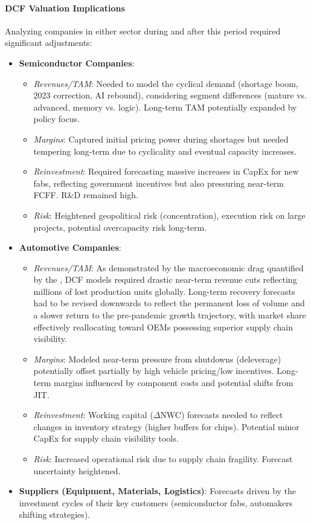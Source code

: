 \paragraph{DCF Valuation Implications}
Analyzing companies in either sector during and after this period required significant adjustments:
\begin{itemize}
    \item \textbf{Semiconductor Companies}:
          \begin{itemize}
              \item \textit{Revenues/TAM}: Needed to model the cyclical demand (shortage boom, 2023 correction, AI rebound), considering segment differences (mature vs. advanced, memory vs. logic). Long-term TAM potentially expanded by policy focus.
              \item \textit{Margins}: Captured initial pricing power during shortages but needed tempering long-term due to cyclicality and eventual capacity increases.
              \item \textit{Reinvestment}: Required forecasting massive increases in CapEx for new fabs, reflecting government incentives but also pressuring near-term FCFF. R\&D remained high.
              \item \textit{Risk}: Heightened geopolitical risk (concentration), execution risk on large projects, potential overcapacity risk long-term.
          \end{itemize}
    \item \textbf{Automotive Companies}:
          \begin{itemize}
              \item \textit{Revenues/TAM}: As demonstrated by the macroeconomic drag quantified by the \textcite{ecb2021trade}, DCF models required drastic near-term revenue cuts reflecting millions of lost production units globally. Long-term recovery forecasts had to be revised downwards to reflect the permanent loss of volume and a slower return to the pre-pandemic growth trajectory, with market share effectively reallocating toward OEMs possessing superior supply chain visibility.
              \item \textit{Margins}: Modeled near-term pressure from shutdowns (deleverage) potentially offset partially by high vehicle pricing/low incentives. Long-term margins influenced by component costs and potential shifts from JIT.
              \item \textit{Reinvestment}: Working capital (\(\Delta\)NWC) forecasts needed to reflect changes in inventory strategy (higher buffers for chips). Potential minor CapEx for supply chain visibility tools.
              \item \textit{Risk}: Increased operational risk due to supply chain fragility. Forecast uncertainty heightened.
          \end{itemize}
    \item \textbf{Suppliers (Equipment, Materials, Logistics)}: Forecasts driven by the investment cycles of their key customers (semiconductor fabs, automakers shifting strategies).
\end{itemize}

